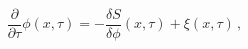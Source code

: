 \begin{equation}
\frac{\partial}{\partial\tau} \phi(x,\tau) =
- \frac{\delta S}{\delta\phi}(x,\tau) + \xi(x,\tau) \, ,
\label{eq3}
\end{equation}

